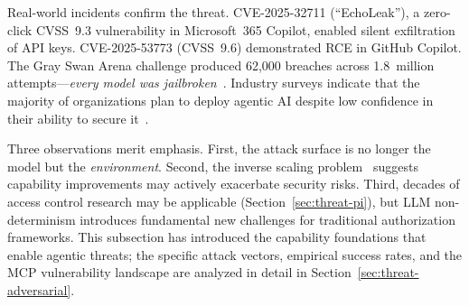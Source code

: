 Real-world incidents confirm the threat. CVE-2025-32711 (``EchoLeak''), a zero-click CVSS~9.3 vulnerability in Microsoft~365 Copilot, enabled silent exfiltration of API keys. CVE-2025-53773 (CVSS~9.6) demonstrated RCE in GitHub Copilot. The Gray Swan Arena challenge produced 62,000 breaches across 1.8~million attempts---\emph{every model was jailbroken}~\cite{grayswan2025arena}. Industry surveys indicate that the majority of organizations plan to deploy agentic AI despite low confidence in their ability to secure it~\cite{cisco2026aisecurity}.

Three observations merit emphasis. First, the attack surface is no longer the model but the \emph{environment}. Second, the inverse scaling problem~\cite{wang2025mcptox} suggests capability improvements may actively exacerbate security risks. Third, decades of access control research may be applicable (Section~\ref{sec:threat-pi}), but LLM non-determinism introduces fundamental new challenges for traditional authorization frameworks. This subsection has introduced the capability foundations that enable agentic threats; the specific attack vectors, empirical success rates, and the MCP vulnerability landscape are analyzed in detail in Section~\ref{sec:threat-adversarial}.


